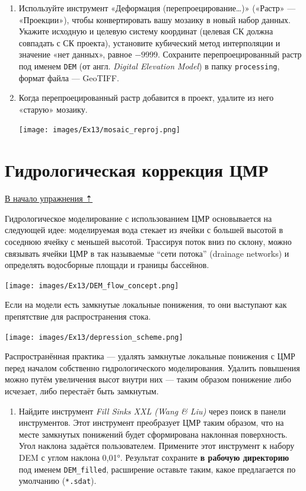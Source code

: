\documentclass[
  12pt,
]{book}
\providecommand{\tightlist}{%
  \setlength{\itemsep}{0pt}\setlength{\parskip}{0pt}}
\begin{document}
\begin{enumerate}
\def\labelenumi{\arabic{enumi}.}
\setcounter{enumi}{9}
\item
  Используйте инструмент «Деформация (перепроецирование\ldots)» («Растр» --- «Проекции»), чтобы конвертировать вашу мозаику в новый набор данных. Укажите исходную и целевую систему координат (целевая СК должна совпадать с СК проекта), установите кубический метод интерполяции и значение «нет данных», равное \(-9999\). Сохраните перепроецированный растр под именем \texttt{DEM} (от англ. \emph{Digital Elevation Model}) в папку \texttt{processing}, формат файла --- GeoTIFF.
\item
  Когда перепроецированный растр добавится в проект, удалите из него «старую» мозаику.

  \texttt{[image: images/Ex13/mosaic\_reproj.png]}
\end{enumerate}

\hypertarget{hydrodem-preprocessing}{%
\section{Гидрологическая коррекция ЦМР}\label{hydrodem-preprocessing}}

\protect\hyperlink{hydrodem}{В начало упражнения ⇡}

Гидрологическое моделирование с использованием ЦМР основывается на следующей идее: моделируемая вода стекает из ячейки с большей высотой в соседнюю ячейку с меньшей высотой. Трассируя поток вниз по склону, можно связывать ячейки ЦМР в так называемые ``сети потока'' (drainage networks) и определять водосборные площади и границы бассейнов.

\texttt{[image: images/Ex13/DEM\_flow\_concept.png]}

Если на модели есть замкнутые локальные понижения, то они выступают как препятствие для распространения стока.

\texttt{[image: images/Ex13/depression\_scheme.png]}

Распространённая практика --- удалять замкнутые локальные понижения с ЦМР перед началом собственно гидрологического моделирования. Удалить повышения можно путём увеличения высот внутри них --- таким образом понижение либо исчезает, либо перестаёт быть замкнутым.

\begin{enumerate}
\def\labelenumi{\arabic{enumi}.}
\tightlist
\item
  Найдите инструмент \emph{Fill Sinks XXL (Wang \& Liu)} через поиск в панели инструментов. Этот инструмент преобразует ЦМР таким образом, что на месте замкнутых понижений будет сформирована наклонная поверхность. Угол наклона задаётся пользователем. Примените этот инструмент к набору DEM с углом наклона 0,01°. Результат сохраните \textbf{в рабочую директорию} под именем \texttt{DEM\_filled}, расширение оставьте таким, какое предлагается по умолчанию (\texttt{*.sdat}).
\end{enumerate}
\end{document}

